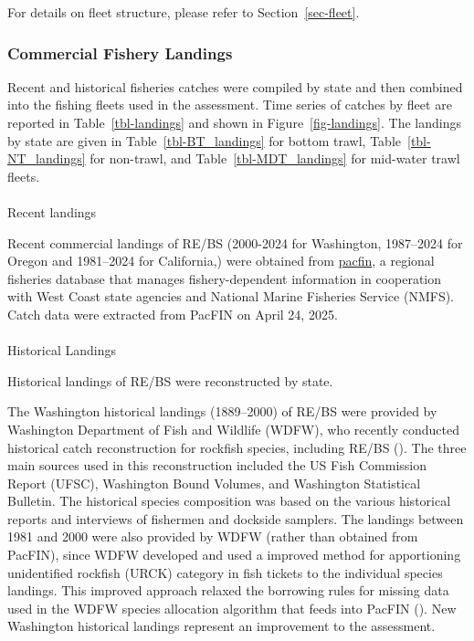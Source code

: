 \documentclass[
]{scrartcl}
\makeatletter
\let\oldparagraph\paragraph
\renewcommand{\paragraph}{
    \@ifstar
      \xxxParagraphStar
      \xxxParagraphNoStar
  }
\newcommand{\xxxParagraphStar}[1]{\oldparagraph*{#1}\mbox{}}
\newcommand{\xxxParagraphNoStar}[1]{\oldparagraph{#1}\mbox{}}
\makeatother
\begin{document}
For details on fleet structure, please refer to Section~\ref{sec-fleet}.

\subsubsection{Commercial Fishery
Landings}\label{commercial-fishery-landings}

Recent and historical fisheries catches were compiled by state and then
combined into the fishing fleets used in the assessment. Time series of
catches by fleet are reported in Table~\ref{tbl-landings} and shown in
Figure~\ref{fig-landings}. The landings by state are given in
Table~\ref{tbl-BT_landings} for bottom trawl,
Table~\ref{tbl-NT_landings} for non-trawl, and
Table~\ref{tbl-MDT_landings} for mid-water trawl fleets.

\paragraph{Recent landings}\label{recent-landings}

Recent commercial landings of RE/BS (2000-2024 for Washington,
1987--2024 for Oregon and 1981--2024 for California,) were obtained from
\href{www.pacfin.psmfc.org}{\gls{pacfin}}, a regional fisheries database
that manages fishery-dependent information in cooperation with West
Coast state agencies and National Marine Fisheries Service (NMFS). Catch
data were extracted from PacFIN on April 24, 2025.

\paragraph{Historical Landings}\label{historical-landings}

Historical landings of RE/BS were reconstructed by state.

The Washington historical landings (1889--2000) of RE/BS were provided
by Washington Department of Fish and Wildlife (WDFW), who recently
conducted historical catch reconstruction for rockfish species,
including RE/BS (). The three main sources used in this reconstruction included
the US Fish Commission Report (UFSC), Washington Bound Volumes, and
Washington Statistical Bulletin. The historical species composition was
based on the various historical reports and interviews of fishermen and
dockside samplers. The landings between 1981 and 2000 were also provided
by WDFW (rather than obtained from PacFIN), since WDFW developed and
used a improved method for apportioning unidentified rockfish (URCK)
category in fish tickets to the individual species landings. This
improved approach relaxed the borrowing rules for missing data used in
the WDFW species allocation algorithm that feeds into PacFIN
().
New Washington historical landings represent an improvement to the
assessment.
\end{document}
